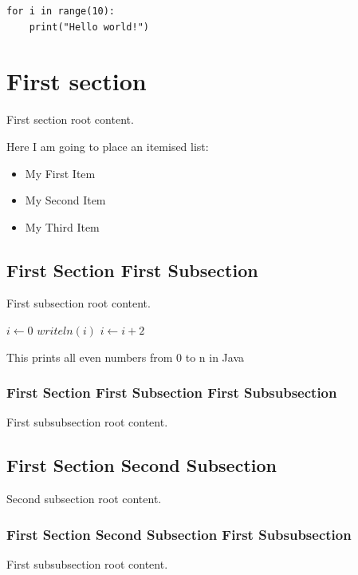 \documentclass[12pt,twocolumn,a4paper,twoside]{IEEEtran}
\begin{document}

\begin{lstlisting}
for i in range(10):
    print("Hello world!")
\end{lstlisting}

\section{First section}
First section root content.

Here I am going to place an itemised list:

\begin{itemize}
\item My First Item
\item My Second Item
\item My Third Item
\end{itemize}

\subsection{First Section First Subsection}
First subsection root content.


\begin{algorithm}
    \begin{algorithmic}
        \STATE $i\gets 0$
            \STATE $writeln(i)$
            \STATE $i\gets i+2$
        \ENDWHILE
    \end{algorithmic}
    \caption{This prints all even numbers from 0 to n in Java}
    \label{loopAlgorithm}
\end{algorithm}

\subsubsection{First Section First Subsection First Subsubsection}
First subsubsection root content.
\subsection{First Section Second Subsection}
Second subsection root content.
\subsubsection{First Section Second Subsection First Subsubsection}
First subsubsection root content.
\end{document}
